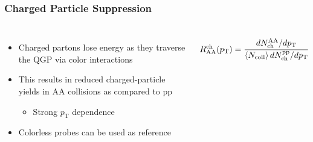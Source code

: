 \begin{frame}
  \frametitle{\textbf{Charged Particle Suppression}}
  \begin{columns}
    \begin{itemize}
    \item Charged partons lose energy as they traverse the QGP via color interactions
    \item This results in reduced charged-particle yields in AA collisions as compared to pp
      \begin{itemize}
      \item Strong $p_{\text{T}}$ dependence
      \end{itemize}
    \item Colorless probes can be used as reference
    \end{itemize}
    \begin{align*}
      R_{\text{AA}}^{\text{ch}} (p_{\text{T}}) = \cfrac{dN^{\text{AA}}_{\text{ch}} / dp_{\text{T}}}{\left< N_{\text{coll}} \right> dN^{\text{pp}}_{\text{ch}} / dp_{\text{T}}}
    \end{align*}
  \end{columns}
\end{frame}
